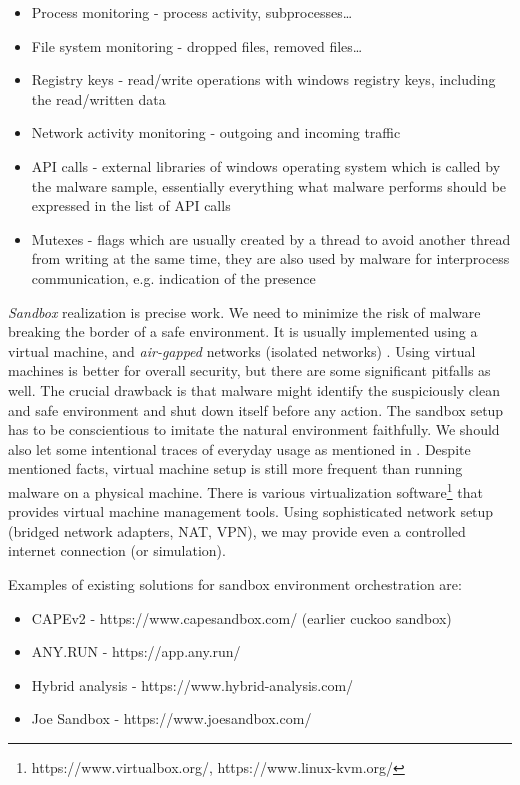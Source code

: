 \begin{itemize}
  \itemsep0em 
  \item Process monitoring - process activity, subprocesses\dots
  \item File system monitoring - dropped files, removed files\dots
  \item Registry keys - read/write operations with windows registry keys, including the read/written data
  \item Network activity monitoring - outgoing and incoming traffic
  \item API calls - external libraries of windows operating system which is called by the malware sample, essentially everything what malware performs should be expressed in the list of API calls
  \item Mutexes - flags which are usually created by a thread to avoid another thread from writing at the same time, they are also used by malware for interprocess communication, e.g. indication of the presence
\end{itemize}

\emph{Sandbox} realization is precise work. We need to minimize the risk of malware breaking the border of a safe environment. It is usually implemented using a virtual machine, and \emph{air-gapped} networks (isolated networks) \cite{Sikorski2012}. Using virtual machines is better for overall security, but there are some significant pitfalls as well. The crucial drawback is that malware might identify the suspiciously clean and safe environment and shut down itself before any action. The sandbox setup has to be conscientious to imitate the natural environment faithfully. We should also let some intentional traces of everyday usage as mentioned in \cite{CAPESand75:online}. Despite mentioned facts, virtual machine setup is still more frequent than running malware on a physical machine. There is various virtualization software\footnote{https://www.virtualbox.org/, https://www.linux-kvm.org/} that provides virtual machine management tools. Using sophisticated network setup (bridged network adapters, NAT, VPN), we may provide even a controlled internet connection (or simulation).

Examples of existing solutions for sandbox environment orchestration are:
\begin{itemize}
  \itemsep0em 
  \item CAPEv2 - https://www.capesandbox.com/ (earlier cuckoo sandbox)
  \item ANY.RUN - https://app.any.run/
  \item Hybrid analysis - https://www.hybrid-analysis.com/
  \item Joe Sandbox - https://www.joesandbox.com/
\end{itemize}


